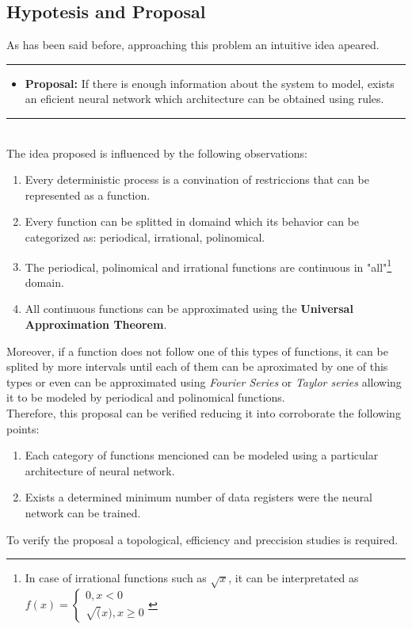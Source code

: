 \documentclass[a4paper, 11pt]{article}
\begin{document}
\subsection{Hypotesis and Proposal}
As has been said before, approaching this problem an intuitive idea apeared. \\
\rule{\linewidth}{0.4pt}
\begin{itemize}
    \item \textbf{Proposal:} If there is enough information about the system to model, exists an eficient neural network which architecture can be obtained using rules.
\end{itemize}
\rule{\linewidth}{0.4pt}\\ \vspace{0.5em}
The idea proposed is influenced by the following observations:
\begin{enumerate}
    \item Every deterministic process is a convination of restriccions that can be represented as a function.
    \item Every function can be splitted in domaind which its behavior can be categorized as: periodical, irrational, polinomical.
    \item The periodical, polinomical and irrational functions are continuous in "all"\footnote{In case of irrational functions such as $\sqrt{x}$, it can be interpretated as $f(x) = \left\{ \begin{matrix} 0, x < 0 \\ \sqrt(x), x \geq 0 \end{matrix} \right.$} domain.
    \item All continuous functions can be approximated using the \textbf{Universal Approximation Theorem}.
\end{enumerate}
Moreover, if a function does not follow one of this types of functions, it can be splited by more intervals until each of them can be aproximated by one of this types or even can be approximated using \textit{Fourier Series} or \textit{Taylor series} allowing it to be modeled by periodical and polinomical functions.\\
Therefore, this proposal can be verified reducing it into corroborate the following points:
\begin{enumerate}
    \item Each category of functions mencioned can be modeled using a particular architecture of neural network.
    \item Exists a determined minimum number of data registers were the neural network can be trained.  
\end{enumerate}
To verify the proposal a topological, efficiency and preccision studies is required.
\end{document}
